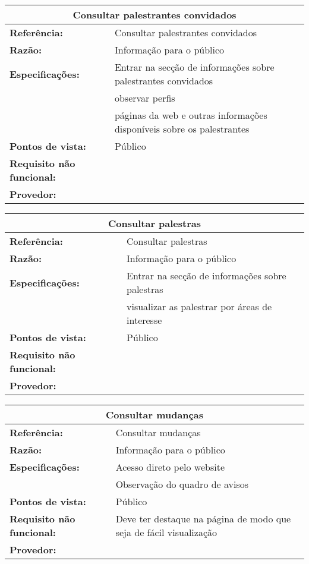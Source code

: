 \documentclass[letter]{article}
\begin{document}
%
\begin{table}[h!]\begin{center}
\begin{tabular}{|ll|}
\hline 
\multicolumn{2}{|c|}{\textbf{Consultar palestrantes convidados}}\tabularnewline
\hline
\textbf{Referência:} & Consultar palestrantes convidados\tabularnewline
\textbf{Razão:} & Informação para o público\tabularnewline
\textbf{Especificações:} & Entrar na secção de informações sobre palestrantes convidados\tabularnewline
 & observar perfis\tabularnewline
 & páginas da web e outras informações disponíveis sobre os palestrantes\tabularnewline
\textbf{Pontos de vista:} & Público\tabularnewline
\textbf{Requisito não funcional:} & \tabularnewline
\textbf{Provedor:} & \tabularnewline
\hline\end{tabular}\end{center}
\end{table}


%
\begin{table}[h!]\begin{center}
\begin{tabular}{|ll|}
\hline 
\multicolumn{2}{|c|}{\textbf{Consultar palestras}}\tabularnewline
\hline
\textbf{Referência:} & Consultar palestras\tabularnewline
\textbf{Razão:} & Informação para o público\tabularnewline
\textbf{Especificações:} & Entrar na secção de informações sobre palestras\tabularnewline
 & visualizar as palestrar por áreas de interesse\tabularnewline
\textbf{Pontos de vista:} & Público\tabularnewline
\textbf{Requisito não funcional:} & \tabularnewline
\textbf{Provedor:} & \tabularnewline
\hline\end{tabular}\end{center}
\end{table}


%
\begin{table}[h!]\begin{center}
\begin{tabular}{|ll|}
\hline 
\multicolumn{2}{|c|}{\textbf{Consultar mudanças}}\tabularnewline
\hline
\textbf{Referência:} & Consultar mudanças\tabularnewline
\textbf{Razão:} & Informação para o público\tabularnewline
\textbf{Especificações:} & Acesso direto pelo website\tabularnewline
 & Observação do quadro de avisos\tabularnewline
\textbf{Pontos de vista:} & Público\tabularnewline
\textbf{Requisito não funcional:} & Deve ter destaque na página de modo que seja de fácil visualização\tabularnewline
\textbf{Provedor:} & \tabularnewline
\hline\end{tabular}\end{center}
\end{table}
\end{document}
